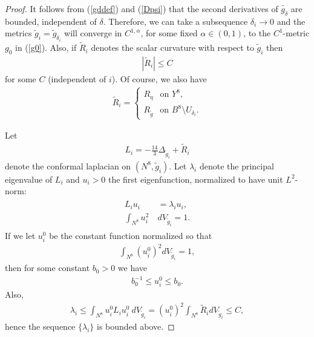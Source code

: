 \documentclass{amsart}
\newcommand{\Ri}{\widetilde{R}_i}
\newcommand{\wtg}{\widetilde{g}}
\newcommand{\di}{dV_{\widetilde{g}_i}}
\newcommand{\wtd}{\widetilde{g_{\delta}}}
\newcommand{\wti}{\widetilde{g}_i}
\theoremstyle{definition}
\theoremstyle{remark}
\numberwithin{equation}{section}
\begin{document}
\begin{proof}
It follows from (\ref{gddef}) and (\ref{Dpsi}) that the second derivatives of $\wtd$ are bounded, independent of $\delta$.  Therefore, we can take a subsequence $\delta_i \rightarrow 0$ and the metrics $\wti = \widetilde{g}_{\delta_i}$ will converge in $C^{1,\alpha}$, for some fixed $\alpha \in (0,1)$, to the $C^1$-metric $g_0$ in (\ref{g0}).  Also, if $\Ri$ denotes the scalar curvature with respect to $\wti$ then
\begin{align} \label{Rd2}
| \Ri | \leq C
\end{align}
for some $C$ (independent of $i$).  Of course, we also have
\begin{align*} %
\Ri = \begin{cases} R_{\eta} \ \ \mbox{ on } Y^8, \\
R_{\wtg} \ \ \mbox{ on } B^8 \setminus U_{\delta_i}.
\end{cases}
\end{align*}

Let
\begin{align} \label{Li}
L_i = - \frac{14}{3} \Delta_{\wti} + \Ri
\end{align}
denote the conformal laplacian on $(N^8, \wti)$.  Let $\lambda_i$ denote the principal eigenvalue of $L_i$ and $u_i > 0$ the first eigenfunction, normalized to have unit $L^2$-norm:
\begin{align} \label{uidef} \begin{split}
L_i u_i &= \lambda_i u_i, \\
\int_{N^8} u_i^2 \ & \di = 1.
\end{split}
\end{align}
If we let $u_i^0$ be the constant function normalized so that
\begin{align*}
\int_{N^8} (u_i^0)^2 \di = 1,
\end{align*}
then for some constant $b_0 > 0$ we have
\begin{align*}
b_0^{-1} \leq u_i^0 \leq b_0.
\end{align*}
Also,
\begin{align*}
\lambda_i \leq \int_{N^8} u_i^0 L_i u_i^0 \ \di = (u_i^0)^2 \int_{N^8} \Ri \di \leq C,
\end{align*}
hence the sequence $\{ \lambda_i \}$ is bounded above.


\end{proof}
\end{document}
